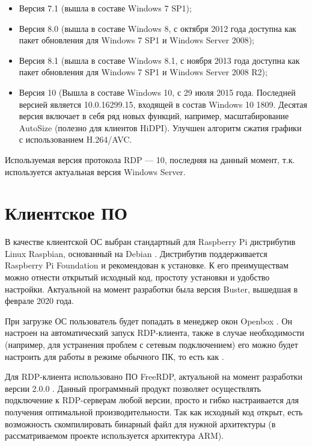 \begin{itemize}
    \item Версия 7.1 (вышла в составе Windows 7 SP1);
    \item Версия 8.0 (вышла в составе Windows 8, с октября 2012 года доступна как пакет
        обновления для Windows 7 SP1 и Windows Server 2008);
    \item Версия 8.1 (вышла в составе Windows 8.1, с ноября 2013 года доступна как пакет
        обновления для Windows 7 SP1 и Windows Server 2008 R2);
    \item Версия 10 (Вышла в составе Windows 10, с 29 июля 2015 года. Последней версией
        является 10.0.16299.15, входящей в состав Windows 10 1809. Десятая версия
        включает в себя ряд новых функций, например, масштабирование AutoSize (полезно
        для клиентов HiDPI). Улучшен алгоритм сжатия графики с использованием H.264/AVC.
\end{itemize}

Используемая версия протокола RDP — 10, последняя на данный момент, т.к. используется
актуальная версия Windows Server.

\section{Клиентское ПО}

В качестве клиентской ОС выбран стандартный для Raspberry Pi дистрибутив Linux Raspbian,
основанный на Debian \cite{ref:raspbian}.
Дистрибутив поддерживается Raspberry Pi Foundation и рекомендован к установке.
К его преимуществам можно отнести открытый исходный код, простоту установки и удобство 
настройки. 
Актуальной на момент разработки была версия Buster, вышедшая в феврале 2020 года.

При загрузке ОС пользователь будет попадать в менеджер окон Openbox \cite{ref:openbox}.
Он настроен на автоматический запуск RDP-клиента, также в случае необходимости
(например, для устранения проблем с сетевым подключением) его можно будет настроить для
работы в режиме обычного ПК, то есть как .

Для RDP-клиента использовано ПО FreeRDP, актуальной на момент разработки версии 2.0.0
\cite{ref:freerdp}. Данный программный продукт позволяет осуществлять подключение к
RDP-серверам любой версии, просто и гибко настраивается для получения оптимальной
производительности.  Так как исходный код открыт, есть возможность скомпилировать
бинарный файл для нужной архитектуры (в рассматриваемом проекте используется архитектура
ARM).

